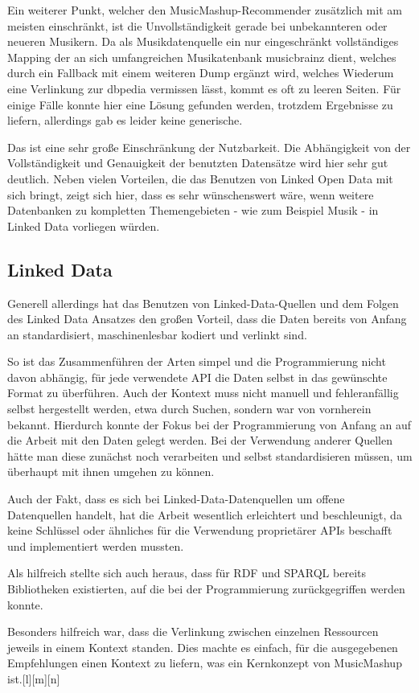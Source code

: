 Ein weiterer Punkt, welcher den MusicMashup-Recommender zusätzlich mit am meisten einschränkt, ist die Unvollständigkeit gerade bei unbekannteren oder neueren Musikern. Da als Musikdatenquelle ein nur eingeschränkt vollständiges Mapping der an sich umfangreichen Musikatenbank musicbrainz dient, welches durch ein Fallback mit einem weiteren Dump ergänzt wird, welches Wiederum eine Verlinkung zur dbpedia vermissen lässt, kommt es oft zu leeren Seiten. Für einige Fälle konnte hier eine Lösung gefunden werden, trotzdem Ergebnisse zu liefern, allerdings gab es leider keine generische.

Das ist eine sehr große Einschränkung der Nutzbarkeit. Die Abhängigkeit von der Vollständigkeit und Genauigkeit der benutzten Datensätze wird hier sehr gut deutlich. Neben vielen Vorteilen, die das Benutzen von Linked Open Data mit sich bringt, zeigt sich hier, dass es sehr wünschenswert wäre, wenn weitere Datenbanken zu kompletten Themengebieten - wie zum Beispiel Musik - in Linked Data vorliegen würden.

\subsection{Linked Data}

Generell allerdings hat das Benutzen von Linked-Data-Quellen und dem Folgen des Linked Data Ansatzes den großen Vorteil, dass die Daten bereits von Anfang an standardisiert, maschinenlesbar kodiert und verlinkt sind.

So ist das Zusammenführen der Arten simpel und die Programmierung nicht davon abhängig, für jede verwendete API die Daten selbst in das gewünschte Format zu überführen. Auch der Kontext muss nicht manuell und fehleranfällig selbst hergestellt werden, etwa durch Suchen, sondern war von vornherein bekannt. Hierdurch konnte der Fokus bei der Programmierung von Anfang an auf die Arbeit mit den Daten gelegt werden. Bei der Verwendung anderer Quellen hätte man diese zunächst noch verarbeiten und selbst standardisieren müssen, um überhaupt mit ihnen umgehen zu können.

Auch der Fakt, dass es sich bei Linked-Data-Datenquellen um  offene Datenquellen handelt, hat die Arbeit wesentlich erleichtert und beschleunigt, da keine Schlüssel oder ähnliches für die Verwendung proprietärer APIs beschafft und implementiert werden mussten. 

Als hilfreich stellte sich auch heraus, dass für RDF und SPARQL bereits Bibliotheken existierten, auf die bei der Programmierung zurückgegriffen werden konnte.

Besonders hilfreich war, dass die Verlinkung zwischen einzelnen Ressourcen jeweils in einem Kontext standen. Dies machte es einfach, für die ausgegebenen Empfehlungen einen Kontext zu liefern, was ein Kernkonzept von MusicMashup ist.[l][m][n]